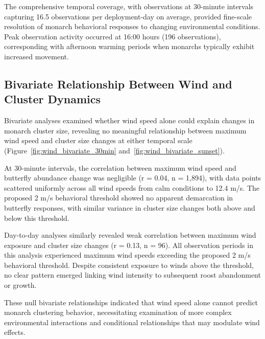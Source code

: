 The comprehensive temporal coverage, with observations at 30-minute intervals capturing 16.5 observations per deployment-day on average, provided fine-scale resolution of monarch behavioral responses to changing environmental conditions. Peak observation activity occurred at 16:00 hours (196 observations), corresponding with afternoon warming periods when monarchs typically exhibit increased movement.

\subsection{Bivariate Relationship Between Wind and Cluster Dynamics}

Bivariate analyses examined whether wind speed alone could explain changes in monarch cluster size, revealing no meaningful relationship between maximum wind speed and cluster size changes at either temporal scale (Figure~\ref{fig:wind_bivariate_30min} and~\ref{fig:wind_bivariate_sunset}).

At 30-minute intervals, the correlation between maximum wind speed and butterfly abundance change was negligible (r = 0.04, n = 1,894), with data points scattered uniformly across all wind speeds from calm conditions to 12.4 m/s. The proposed 2 m/s behavioral threshold showed no apparent demarcation in butterfly responses, with similar variance in cluster size changes both above and below this threshold.

Day-to-day analyses similarly revealed weak correlation between maximum wind exposure and cluster size changes (r = 0.13, n = 96). All observation periods in this analysis experienced maximum wind speeds exceeding the proposed 2 m/s behavioral threshold. Despite consistent exposure to winds above the threshold, no clear pattern emerged linking wind intensity to subsequent roost abandonment or growth.

These null bivariate relationships indicated that wind speed alone cannot predict monarch clustering behavior, necessitating examination of more complex environmental interactions and conditional relationships that may modulate wind effects.

